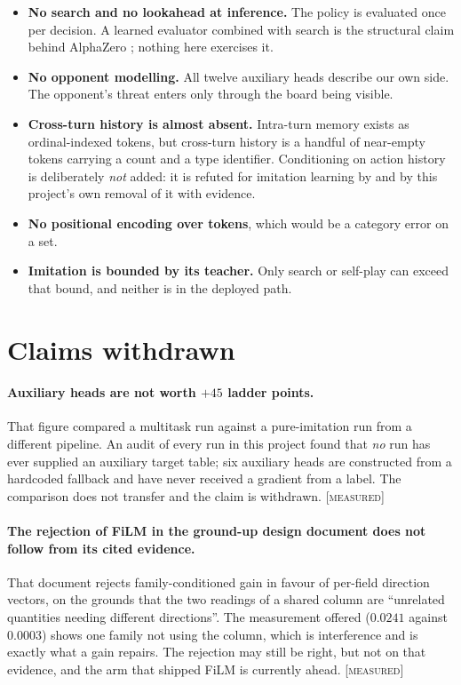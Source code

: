 \documentclass[11pt,a4paper]{article}
\newcommand{\tagM}{\textcolor{cV2}{\textsc{[measured]}}}
\begin{document}
\begin{itemize}\itemsep2pt
\item \textbf{No search and no lookahead at inference.} The policy is evaluated
once per decision. A learned evaluator combined with search is the structural
claim behind AlphaZero \cite{silver2017alphazero}; nothing here exercises it.
\item \textbf{No opponent modelling.} All twelve auxiliary heads describe our own
side. The opponent's threat enters only through the board being visible.
\item \textbf{Cross-turn history is almost absent.} Intra-turn memory exists as
ordinal-indexed tokens, but cross-turn history is a handful of near-empty tokens
carrying a count and a type identifier. Conditioning on action history is
deliberately \emph{not} added: it is refuted for imitation learning by
\cite{dehaan2019causal,wen2020copycat,ortega2021delusions} and by this project's
own removal of it with evidence.
\item \textbf{No positional encoding over tokens}, which would be a category
error on a set.
\item \textbf{Imitation is bounded by its teacher.} Only search or self-play can
exceed that bound, and neither is in the deployed path.
\end{itemize}

\section{Claims withdrawn}

\paragraph{Auxiliary heads are not worth $+45$ ladder points.} That figure
compared a multitask run against a pure-imitation run from a different pipeline.
An audit of every run in this project found that \emph{no} run has ever supplied
an auxiliary target table; six auxiliary heads are constructed from a hardcoded
fallback and have never received a gradient from a label. The comparison does not
transfer and the claim is withdrawn. \tagM

\paragraph{The rejection of FiLM in the ground-up design document does not
follow from its cited evidence.} That document rejects family-conditioned
gain in favour of per-field direction vectors, on the grounds that the two
readings of a shared column are ``unrelated quantities needing different
directions''. The measurement offered ($0.0241$ against $0.0003$) shows one
family not using the column, which is interference and is exactly what a gain
repairs. The rejection may still be right, but not on that evidence, and the
arm that shipped FiLM is currently ahead. \tagM
\end{document}
